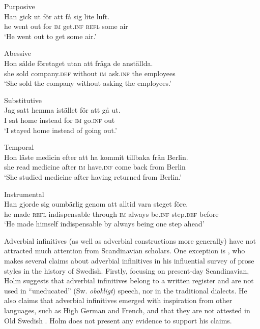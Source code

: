 \documentclass[output=paper]{langscibook}
\begin{document}
\ea
\label{ex:kalm:1}
\ea Purposive\label{ex:kalm:1a}\\
\gll Han gick ut för att få sig lite luft.\\
he went out for \textsc{im} get.\textsc{inf} \textsc{refl} some air\\
\glt ‘He went out to get some air.’

\ex Abessive\label{ex:kalm:1b}\\
\gll Hon sålde företaget utan att fråga de anställda.\\
she sold company.\textsc{def} without \textsc{im} ask.\textsc{inf} the employees\\
\glt ‘She sold the company without asking the employees.’

\ex Substitutive\label{ex:kalm:1c}\\
\gll Jag satt hemma istället för att gå ut.\\
I sat home instead for \textsc{im} go.\textsc{inf} out\\
\glt‘I stayed home instead of going out.’

\ex Temporal\label{ex:kalm:1d}\\
\gll Hon läste medicin efter att ha kommit tillbaka från Berlin.\\
she read medicine after \textsc{im} have.\textsc{inf} come back from Berlin\\
\glt ‘She studied medicine after having returned from Berlin.’

\ex Instrumental\label{ex:kalm:1e}\\
\gll Han gjorde sig oumbärlig genom att alltid vara steget före.\\
he made \textsc{refl} indispensable through \textsc{im} always be.\textsc{inf} step.\textsc{def} before\\
\glt ‘He made himself indispensable by always being one step ahead’
\z
\z

Adverbial infinitives (as well as adverbial constructions more generally) have not attracted much attention from Scandinavian scholars. One exception is \citet{Holm1967}, who makes several claims about adverbial infinitives in his influential survey of prose styles in the history of Swedish. Firstly, focusing on present-day Scandinavian, Holm suggests that adverbial infinitives belong to a written register and are not used in “uneducated” (Sw. \textit{obokligt}) speech, nor in the traditional dialects. He also claims that adverbial infinitives emerged with inspiration from other languages, such as High German and French, and that they are not attested in Old Swedish \citep[27]{Holm1967}. Holm does not present any evidence to support his claims. 
\end{document}
